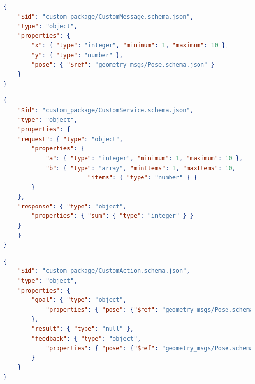 \begin{lstlisting}[language=JSON, caption={ROS message definition using JSON schema},label=lst:json-ros-msg]
{
	"$id": "custom_package/CustomMessage.schema.json",
	"type": "object",
	"properties": {
		"x": { "type": "integer", "minimum": 1, "maximum": 10 },
		"y": { "type": "number" },
		"pose": { "$ref": "geometry_msgs/Pose.schema.json" }
	}
}
\end{lstlisting}

\begin{lstlisting}[language=JSON, caption={ROS service definition using JSON schema},label=lst:json-ros-srv]
{
	"$id": "custom_package/CustomService.schema.json",
	"type": "object",
	"properties": {
	"request": { "type": "object",
		"properties": {
			"a": { "type": "integer", "minimum": 1, "maximum": 10 },
			"b": { "type": "array", "minItems": 1, "maxItems": 10,
						"items": { "type": "number" } }
		}
	},
	"response": { "type": "object",
		"properties": { "sum": { "type": "integer" } }
	}
	}
}
\end{lstlisting}

\begin{lstlisting}[language=JSON, caption={ROS action definition using JSON schema},label=lst:json-ros-act]
{
	"$id": "custom_package/CustomAction.schema.json",
	"type": "object",
	"properties": {
		"goal": { "type": "object", 
			"properties": { "pose": {"$ref": "geometry_msgs/Pose.schema.json"} }
		},
		"result": { "type": "null" },
		"feedback": { "type": "object",
			"properties": { "pose": {"$ref": "geometry_msgs/Pose.schema.json"} }
		}
	}
}
\end{lstlisting}

